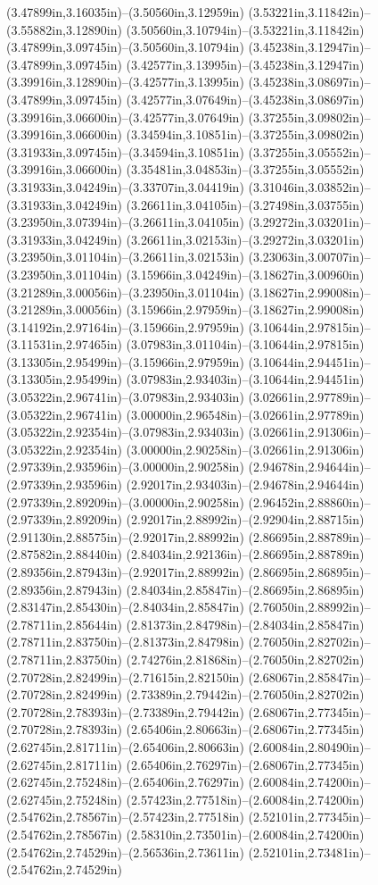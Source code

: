 (3.47899in,3.16035in)--(3.50560in,3.12959in) (3.53221in,3.11842in)--(3.55882in,3.12890in) (3.50560in,3.10794in)--(3.53221in,3.11842in) (3.47899in,3.09745in)--(3.50560in,3.10794in) (3.45238in,3.12947in)--(3.47899in,3.09745in) (3.42577in,3.13995in)--(3.45238in,3.12947in) (3.39916in,3.12890in)--(3.42577in,3.13995in) (3.45238in,3.08697in)--(3.47899in,3.09745in) (3.42577in,3.07649in)--(3.45238in,3.08697in) (3.39916in,3.06600in)--(3.42577in,3.07649in) (3.37255in,3.09802in)--(3.39916in,3.06600in) (3.34594in,3.10851in)--(3.37255in,3.09802in) (3.31933in,3.09745in)--(3.34594in,3.10851in) (3.37255in,3.05552in)--(3.39916in,3.06600in) (3.35481in,3.04853in)--(3.37255in,3.05552in) (3.31933in,3.04249in)--(3.33707in,3.04419in) (3.31046in,3.03852in)--(3.31933in,3.04249in) (3.26611in,3.04105in)--(3.27498in,3.03755in) (3.23950in,3.07394in)--(3.26611in,3.04105in) (3.29272in,3.03201in)--(3.31933in,3.04249in) (3.26611in,3.02153in)--(3.29272in,3.03201in) (3.23950in,3.01104in)--(3.26611in,3.02153in) (3.23063in,3.00707in)--(3.23950in,3.01104in) (3.15966in,3.04249in)--(3.18627in,3.00960in) (3.21289in,3.00056in)--(3.23950in,3.01104in) (3.18627in,2.99008in)--(3.21289in,3.00056in) (3.15966in,2.97959in)--(3.18627in,2.99008in) (3.14192in,2.97164in)--(3.15966in,2.97959in) (3.10644in,2.97815in)--(3.11531in,2.97465in) (3.07983in,3.01104in)--(3.10644in,2.97815in) (3.13305in,2.95499in)--(3.15966in,2.97959in) (3.10644in,2.94451in)--(3.13305in,2.95499in) (3.07983in,2.93403in)--(3.10644in,2.94451in) (3.05322in,2.96741in)--(3.07983in,2.93403in) (3.02661in,2.97789in)--(3.05322in,2.96741in) (3.00000in,2.96548in)--(3.02661in,2.97789in) (3.05322in,2.92354in)--(3.07983in,2.93403in) (3.02661in,2.91306in)--(3.05322in,2.92354in) (3.00000in,2.90258in)--(3.02661in,2.91306in) (2.97339in,2.93596in)--(3.00000in,2.90258in) (2.94678in,2.94644in)--(2.97339in,2.93596in) (2.92017in,2.93403in)--(2.94678in,2.94644in) (2.97339in,2.89209in)--(3.00000in,2.90258in) (2.96452in,2.88860in)--(2.97339in,2.89209in) (2.92017in,2.88992in)--(2.92904in,2.88715in) (2.91130in,2.88575in)--(2.92017in,2.88992in) (2.86695in,2.88789in)--(2.87582in,2.88440in) (2.84034in,2.92136in)--(2.86695in,2.88789in) (2.89356in,2.87943in)--(2.92017in,2.88992in) (2.86695in,2.86895in)--(2.89356in,2.87943in) (2.84034in,2.85847in)--(2.86695in,2.86895in) (2.83147in,2.85430in)--(2.84034in,2.85847in) (2.76050in,2.88992in)--(2.78711in,2.85644in) (2.81373in,2.84798in)--(2.84034in,2.85847in) (2.78711in,2.83750in)--(2.81373in,2.84798in) (2.76050in,2.82702in)--(2.78711in,2.83750in) (2.74276in,2.81868in)--(2.76050in,2.82702in) (2.70728in,2.82499in)--(2.71615in,2.82150in) (2.68067in,2.85847in)--(2.70728in,2.82499in) (2.73389in,2.79442in)--(2.76050in,2.82702in) (2.70728in,2.78393in)--(2.73389in,2.79442in) (2.68067in,2.77345in)--(2.70728in,2.78393in) (2.65406in,2.80663in)--(2.68067in,2.77345in) (2.62745in,2.81711in)--(2.65406in,2.80663in) (2.60084in,2.80490in)--(2.62745in,2.81711in) (2.65406in,2.76297in)--(2.68067in,2.77345in) (2.62745in,2.75248in)--(2.65406in,2.76297in) (2.60084in,2.74200in)--(2.62745in,2.75248in) (2.57423in,2.77518in)--(2.60084in,2.74200in) (2.54762in,2.78567in)--(2.57423in,2.77518in) (2.52101in,2.77345in)--(2.54762in,2.78567in) (2.58310in,2.73501in)--(2.60084in,2.74200in) (2.54762in,2.74529in)--(2.56536in,2.73611in) (2.52101in,2.73481in)--(2.54762in,2.74529in) 
